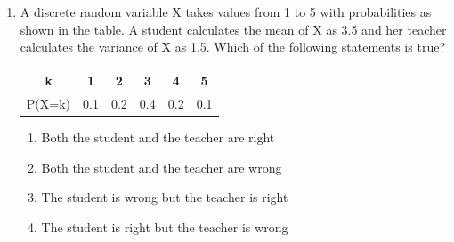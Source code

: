 \documentclass[journal,12pt,twocolumn]{IEEEtran}
\begin{document}
\begin{enumerate}
\begin{enumerate}
\end{enumerate}
%
\solution


\item A discrete random variable X takes values from 1 to 5 with probabilities as shown in the table. A student calculates the mean of X as 3.5 and her teacher calculates the variance of X as 1.5. Which of the following statements is true?

\begin{center}
\begin{tabular}{|c|c|c|c|c|c|}\hline

k & 1 & 2 & 3 & 4 & 5\\ \hline
P(X=k) & 0.1 & 0.2 & 0.4 & 0.2 & 0.1\\ \hline
\end{tabular}
\end{center}

\begin{enumerate}
\item Both the student and the teacher are right
\item Both the student and the teacher are wrong
\item The student is wrong but the teacher is right
\item The student is right but the teacher is wrong
\end{enumerate}

%
%


\end{enumerate}
\end{document}

